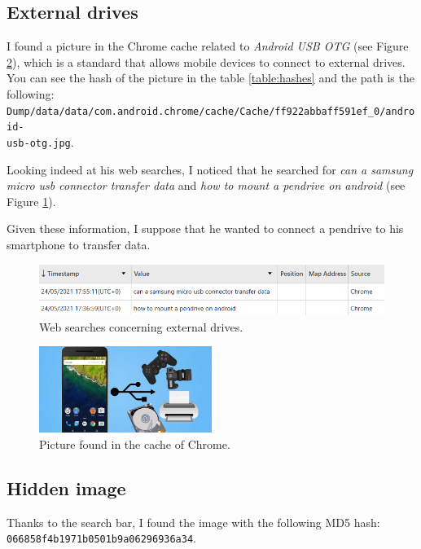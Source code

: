 \documentclass[12pt]{article}
\begin{document}
\subsection{External drives}

I found a picture in the Chrome cache related to \textit{Android USB OTG} (see Figure \ref{fig:usb}), which is a standard that allows mobile devices to connect to external drives. You can see the hash of the picture in the table \ref{table:hashes} and the path is the following:\\
\texttt{Dump/data/data/com.android.chrome/cache/Cache/ff922abbaff591ef\_0/android-\\usb-otg.jpg}.

Looking indeed at his web searches, I noticed that he searched for \textit{can a samsung micro usb connector transfer data} and \textit{how to mount a pendrive on android} (see Figure \ref{fig:web}).

Given these information, I suppose that he wanted to connect a pendrive to his smartphone to transfer data.

\begin{figure}[!ht]
    \centering
    \includegraphics[width=\textwidth]{images/web-searches.png}
    \caption{Web searches concerning external drives.}
    \label{fig:web}
\end{figure}

\begin{figure}
    \centering
    \includegraphics[width=0.5\textwidth]{images/android-usb-otg.jpg}
    \caption{Picture found in the cache of Chrome.}
    \label{fig:usb}
\end{figure}

\subsection{Hidden image}

Thanks to the search bar, I found the image with the following MD5 hash: \\
\texttt{066858f4b1971b0501b9a06296936a34}. 
\end{document}
